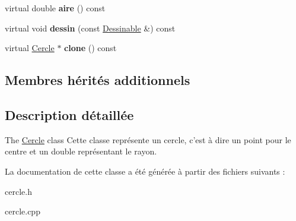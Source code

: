 \begin{DoxyCompactItemize}
\item 
\hypertarget{class_cercle_afc10e82bdd08d4c2a1e15265041cf1d9}{virtual double {\bfseries aire} () const }\label{class_cercle_afc10e82bdd08d4c2a1e15265041cf1d9}

\item 
\hypertarget{class_cercle_a4161496710fd6dadf29dcc0361e445e2}{virtual void {\bfseries dessin} (const \hyperlink{class_dessinable}{Dessinable} \&) const }\label{class_cercle_a4161496710fd6dadf29dcc0361e445e2}

\item 
\hypertarget{class_cercle_a13a9c4f9b5fe1485b3ea74a829a82b22}{virtual \hyperlink{class_cercle}{Cercle} $\ast$ {\bfseries clone} () const }\label{class_cercle_a13a9c4f9b5fe1485b3ea74a829a82b22}

\end{DoxyCompactItemize}
\subsection*{Membres hérités additionnels}


\subsection{Description détaillée}
The \hyperlink{class_cercle}{Cercle} class Cette classe représente un cercle, c'est à dire un point pour le centre et un double représentant le rayon. 

La documentation de cette classe a été générée à partir des fichiers suivants \+:\begin{DoxyCompactItemize}
\item 
cercle.\+h\item 
cercle.\+cpp\end{DoxyCompactItemize}
